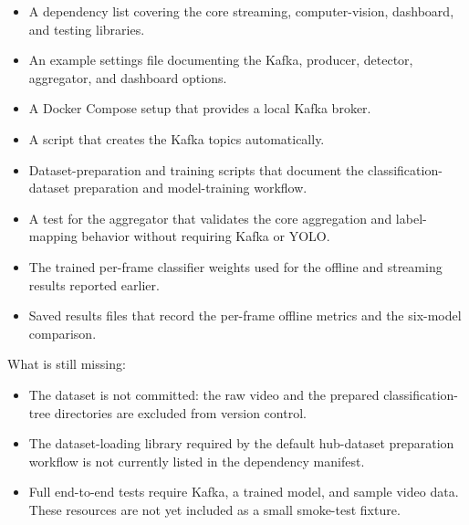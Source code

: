 \documentclass[conference]{IEEEtran}
\begin{document}
\begin{itemize}
    \item A dependency list covering the core streaming, computer-vision,
    dashboard, and testing libraries.

    \item An example settings file documenting the Kafka, producer, detector,
    aggregator, and dashboard options.

    \item A Docker Compose setup that provides a local Kafka broker.

    \item A script that creates the Kafka topics automatically.

    \item Dataset-preparation and training scripts that document the
    classification-dataset preparation and model-training workflow.

    \item A test for the aggregator that validates the core aggregation and
    label-mapping behavior without requiring Kafka or YOLO.

    \item The trained per-frame classifier weights used for the offline and
    streaming results reported earlier.

    \item Saved results files that record the per-frame offline metrics and the
    six-model comparison.
\end{itemize}

What is still missing:

\begin{itemize}
    \item The dataset is not committed: the raw video and the prepared
    classification-tree directories are excluded from version control.

    \item The dataset-loading library required by the default hub-dataset
    preparation workflow is not currently listed in the dependency manifest.

    \item Full end-to-end tests require Kafka, a trained model, and
    sample video data. These resources are not yet included as a small
    smoke-test fixture.
\end{itemize}


\end{document}
